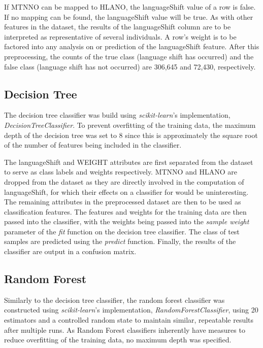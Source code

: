 \documentclass[10pt, conference, compsocconf]{IEEEtran}
\begin{document}
If MTNNO can be mapped to HLANO, the languageShift value of a row is false.  If no mapping can be found, the languageShift value will be true.  As with other features in the dataset, the results of the languageShift column are to be interpreted as representative of several individuals.  A row's weight is to be factored into any analysis on or prediction of the languageShift feature. After this preprocessing, the counts of the true class (language shift has occurred) and the false class (language shift has not occurred) are 306,645 and 72,430, respectively. 


\subsection{Decision Tree}
The decision tree classifier was build using \textit{scikit-learn}'s implementation, \textit{DecisionTreeClassifier}. To prevent overfitting of the training data, the maximum depth of the decision tree was set to 8 since this is approximately the square root of the number of features being included in the classifier.

The languageShift and WEIGHT attributes are first separated from the dataset to serve as class labels and weights respectively.  MTNNO and HLANO are dropped from the dataset as they are directly involved in the computation of languageShift, for which their effects on a classifier for would be uninteresting.  The remaining attributes in the preprocessed dataset are then to be used as classification features. The features and weights for the training data are then passed into the classifier, with the weights being passed into the \textit{sample weight} parameter of the \textit{fit} function on the decision tree classifier. The class of test samples are predicted using the \textit{predict} function. Finally, the results of the classifier are output in a confusion matrix.

\subsection{Random Forest}

Similarly to the decision tree classifier, the random forest classifier was constructed using \textit{scikit-learn}'s implementation, \textit{RandomForestClassifier}, using 20 estimators and a controlled random state to maintain similar, repeatable results after multiple runs. As Random Forest classifiers inherently have measures to reduce overfitting of the training data, no maximum depth was specified.
\end{document}
